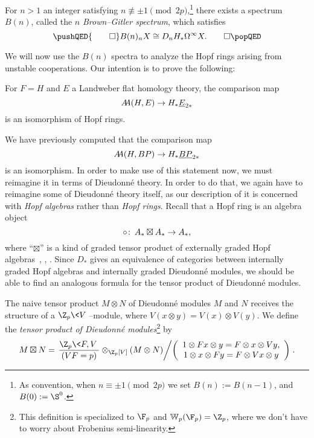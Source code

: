 \begin{corollary}\label{BrownGitlerSpectraDefn}
For \(n > 1\) an integer satisfying \(n \not\equiv \pm 1 \pmod{2p}\),\footnote{As convention, when \(n \equiv \pm 1 \pmod{2p}\) we set \(B(n) := B(n-1)\), and \(B(0) := \S^0\).} there exists a spectrum \(B(n)\), called the \(n\){\th} \textit{Brown--Gitler spectrum}, which satisfies \[\pushQED{\qed}B(n)_n X \cong D_n H_* \Loops^\infty X. \qedhere\popQED\]
\end{corollary}


We will now use the \(B(n)\) spectra to analyze the Hopf rings arising from unstable cooperations.  Our intention is to prove the following:
\begin{theorem}\label{LEFTUnstableCooperations}
For \(F = H\) and \(E\) a Landweber flat homology theory, the comparison map \[\AA(H, E) \to H_* \OS{E}{2*}\] is an isomorphism of Hopf rings.
\end{theorem}
\noindent We have previously computed that the comparison map \[\AA(H, BP) \to H_* \OS{BP}{2*}\] is an isomorphism.  In order to make use of this statement now, we must reimagine it in terms of Dieudonn\'e theory.  In order to do that, we again have to reimagine some of Dieudonn\'e theory itself, as our description of it is concerned with \emph{Hopf algebras} rather than \emph{Hopf rings}.  Recall that a Hopf ring is an algebra object \[\circ\colon\thinspace A_* \boxtimes A_* \to A_*,\] where ``\(\boxtimes\)'' is a kind of graded tensor product of externally graded Hopf algebras~\cite[Proposition 2.6]{HuntonTurner}, \cite[Definition 2.2]{BuchstaberLazarev}, \cite[Section 5]{GoerssDieudonne}.  Since \(D_*\) gives an equivalence of categories between internally graded Hopf algebras and internally graded Dieudonn\'e modules, we should be able to find an analogous formula for the tensor product of Dieudonn\'e modules.

\begin{definition}{\cite[pg.\ 154]{GoerssDieudonne}}
The naive tensor product \(M \otimes N\) of Dieudonn\'e modules \(M\) and \(N\) receives the structure of a \(\Z_p\<V\>\)--module, where \(V(x \otimes y) = V(x) \otimes V(y)\).  We define the \textit{tensor product of Dieudonn\'e modules}\footnote{This definition is specialized to \(\F_p\) and \(\mathbb W_p(\F_p) = \Z_p\), where we don't have to worry about Frobenius semi-linearity.} by \[M \boxtimes N = \left.\frac{\Z_p\<F, V\>}{(VF = p)} \otimes_{\Z_p[V]} (M \otimes N) \middle/ \left( \begin{array}{c} 1 \otimes Fx \otimes y = F \otimes x \otimes Vy, \\ 1 \otimes x \otimes Fy = F \otimes Vx \otimes y \end{array} \right) \right. .\]
\end{definition}

